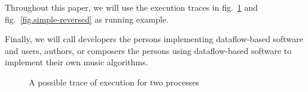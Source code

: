 \documentclass{article}
\begin{document}
    

    
Throughout this paper, we will use the execution traces in fig.~\ref{fig.simple} and fig.~\ref{fig.simple-reversed} as running example. 
    
Finally, we will call developers the persons implementing dataflow-based software and users, authors, or composers the persons using dataflow-based software to implement their own music algorithms.
    
\begin{figure}
  \centering
  \caption{A possible trace of execution for two processes}
  \label{fig.simple}
\end{figure}
	
\end{document}

